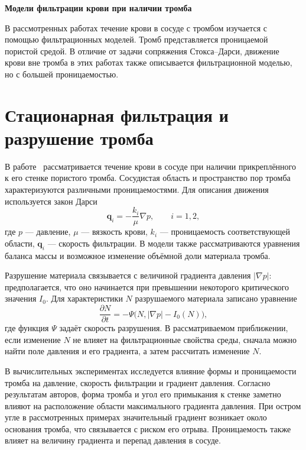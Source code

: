 \documentclass[a4paper,14pt]{extarticle}
\begin{document}
	
	\begin{center}
		\textbf{Модели фильтрации крови при наличии тромба}
	\end{center}
	
	В рассмотренных работах течение крови в сосуде с тромбом
	изучается с помощью фильтрационных моделей. Тромб
	представляется проницаемой пористой средой. В отличие от
	задачи сопряжения Стокса--Дарси, движение крови вне тромба
	в этих работах также описывается фильтрационной моделью,
	но с большей проницаемостью.
	
	\section{Стационарная фильтрация и разрушение тромба}
	
	В работе~\cite{stationary} рассматривается течение крови
	в сосуде при наличии прикреплённого к его стенке пористого
	тромба. Сосудистая область и пространство пор тромба
	характеризуются различными проницаемостями. Для описания
	движения используется закон Дарси
	\begin{equation}
		\mathbf q_i=-\frac{k_i}{\mu}\nabla p,
		\qquad i=1,2,
	\end{equation}
	где $p$ --- давление, $\mu$ --- вязкость крови, $k_i$ ---
	проницаемость соответствующей области, $\mathbf q_i$ ---
	скорость фильтрации. В модели также рассматриваются
	уравнения баланса массы и возможное изменение объёмной доли
	материала тромба.
	
	Разрушение материала связывается с величиной градиента
	давления $|\nabla p|$: предполагается, что оно начинается
	при превышении некоторого критического значения $I_0$.
	Для характеристики $N$ разрушаемого материала записано
	уравнение
	\begin{equation}
		\frac{\partial N}{\partial t}
		=-\Psi\bigl(N,|\nabla p|-I_0(N)\bigr),
	\end{equation}
	где функция $\Psi$ задаёт скорость разрушения. В рассматриваемом
	приближении, если изменение $N$ не влияет на фильтрационные
	свойства среды, сначала можно найти поле давления и его
	градиента, а затем рассчитать изменение $N$.
	
	В вычислительных экспериментах исследуется влияние формы
	и проницаемости тромба на давление, скорость фильтрации и
	градиент давления. Согласно результатам авторов, форма
	тромба и угол его примыкания к стенке заметно влияют на
	расположение области максимального градиента давления.
	При остром угле в рассмотренных примерах значительный
	градиент возникает около основания тромба, что связывается
	с риском его отрыва. Проницаемость также влияет на величину
	градиента и перепад давления в сосуде.
	
\end{document}
